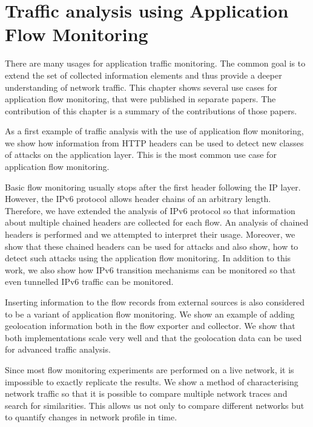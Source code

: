 \chapter{Traffic analysis using Application Flow Monitoring}\label{chap:traffic-analysis-using-application-flow-monitoring}

\begin{chapintro}

There are many usages for application traffic monitoring. The common goal is to extend the set of collected information elements and thus provide a deeper understanding of network traffic. This chapter shows several use cases for application flow monitoring, that were published in separate papers. The contribution of this chapter is a summary of the contributions of those papers.

As a first example of traffic analysis with the use of application flow monitoring, we show how information from HTTP headers can be used to detect new classes of attacks on the application layer. This is the most common use case for application flow monitoring. 

Basic flow monitoring usually stops after the first header following the IP layer. However, the IPv6 protocol allows header chains of an arbitrary length. Therefore, we have extended the analysis of IPv6 protocol so that information about multiple chained headers are collected for each flow. An analysis of chained headers is performed and we attempted to interpret their usage. Moreover, we show that these chained headers can be used for attacks and also show, how to detect such attacks using the application flow monitoring. In addition to this work, we also show how IPv6 transition mechanisms can be monitored so that even tunnelled IPv6 traffic can be monitored.

Inserting information to the flow records from external sources is also considered to be a variant of application flow monitoring. We show an example of adding geolocation information both in the flow exporter and collector. We show that both implementations scale very well and that the geolocation data can be used for advanced traffic analysis.

Since most flow monitoring experiments are performed on a live network, it is impossible to exactly replicate the results. We show a method of characterising network traffic so that it is possible to compare multiple network traces and search for similarities. This allows us not only to compare different networks but to quantify changes in network profile in time.


\end{chapintro}
